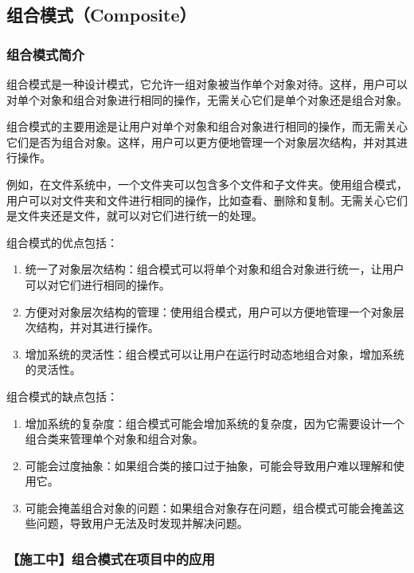 \subsection{组合模式（Composite）}

\subsubsection{组合模式简介}
组合模式是一种设计模式，它允许一组对象被当作单个对象对待。这样，用户可以对单个对象和组合对象进行相同的操作，无需关心它们是单个对象还是组合对象。

组合模式的主要用途是让用户对单个对象和组合对象进行相同的操作，而无需关心它们是否为组合对象。这样，用户可以更方便地管理一个对象层次结构，并对其进行操作。

例如，在文件系统中，一个文件夹可以包含多个文件和子文件夹。使用组合模式，用户可以对文件夹和文件进行相同的操作，比如查看、删除和复制。无需关心它们是文件夹还是文件，就可以对它们进行统一的处理。

组合模式的优点包括：
\begin{enumerate}
    \item 统一了对象层次结构：组合模式可以将单个对象和组合对象进行统一，让用户可以对它们进行相同的操作。
    \item 方便对对象层次结构的管理：使用组合模式，用户可以方便地管理一个对象层次结构，并对其进行操作。
    \item 增加系统的灵活性：组合模式可以让用户在运行时动态地组合对象，增加系统的灵活性。
\end{enumerate}

组合模式的缺点包括：

\begin{enumerate}
    \item 增加系统的复杂度：组合模式可能会增加系统的复杂度，因为它需要设计一个组合类来管理单个对象和组合对象。
    \item 可能会过度抽象：如果组合类的接口过于抽象，可能会导致用户难以理解和使用它。
    \item 可能会掩盖组合对象的问题：如果组合对象存在问题，组合模式可能会掩盖这些问题，导致用户无法及时发现并解决问题。
\end{enumerate}

\subsubsection{【施工中】组合模式在项目中的应用}

